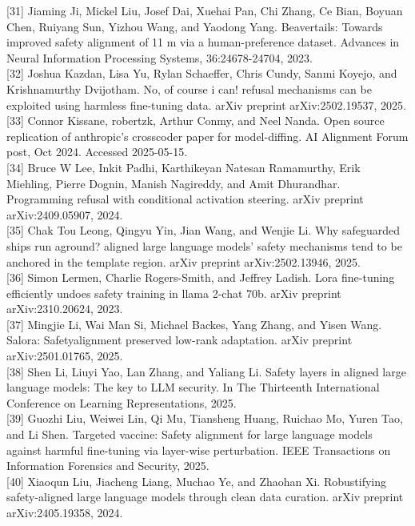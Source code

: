 \documentclass[10pt]{article}
\begin{document}
[31] Jiaming Ji, Mickel Liu, Josef Dai, Xuehai Pan, Chi Zhang, Ce Bian, Boyuan Chen, Ruiyang Sun, Yizhou Wang, and Yaodong Yang. Beavertails: Towards improved safety alignment of 11 m via a human-preference dataset. Advances in Neural Information Processing Systems, 36:24678-24704, 2023.\\[0pt]
[32] Joshua Kazdan, Lisa Yu, Rylan Schaeffer, Chris Cundy, Sanmi Koyejo, and Krishnamurthy Dvijotham. No, of course i can! refusal mechanisms can be exploited using harmless fine-tuning data. arXiv preprint arXiv:2502.19537, 2025.\\[0pt]
[33] Connor Kissane, robertzk, Arthur Conmy, and Neel Nanda. Open source replication of anthropic's crosscoder paper for model-diffing. AI Alignment Forum post, Oct 2024. Accessed 2025-05-15.\\[0pt]
[34] Bruce W Lee, Inkit Padhi, Karthikeyan Natesan Ramamurthy, Erik Miehling, Pierre Dognin, Manish Nagireddy, and Amit Dhurandhar. Programming refusal with conditional activation steering. arXiv preprint arXiv:2409.05907, 2024.\\[0pt]
[35] Chak Tou Leong, Qingyu Yin, Jian Wang, and Wenjie Li. Why safeguarded ships run aground? aligned large language models' safety mechanisms tend to be anchored in the template region. arXiv preprint arXiv:2502.13946, 2025.\\[0pt]
[36] Simon Lermen, Charlie Rogers-Smith, and Jeffrey Ladish. Lora fine-tuning efficiently undoes safety training in llama 2-chat 70b. arXiv preprint arXiv:2310.20624, 2023.\\[0pt]
[37] Mingjie Li, Wai Man Si, Michael Backes, Yang Zhang, and Yisen Wang. Salora: Safetyalignment preserved low-rank adaptation. arXiv preprint arXiv:2501.01765, 2025.\\[0pt]
[38] Shen Li, Liuyi Yao, Lan Zhang, and Yaliang Li. Safety layers in aligned large language models: The key to LLM security. In The Thirteenth International Conference on Learning Representations, 2025.\\[0pt]
[39] Guozhi Liu, Weiwei Lin, Qi Mu, Tiansheng Huang, Ruichao Mo, Yuren Tao, and Li Shen. Targeted vaccine: Safety alignment for large language models against harmful fine-tuning via layer-wise perturbation. IEEE Transactions on Information Forensics and Security, 2025.\\[0pt]
[40] Xiaoqun Liu, Jiacheng Liang, Muchao Ye, and Zhaohan Xi. Robustifying safety-aligned large language models through clean data curation. arXiv preprint arXiv:2405.19358, 2024.\\[0pt]
\end{document}
